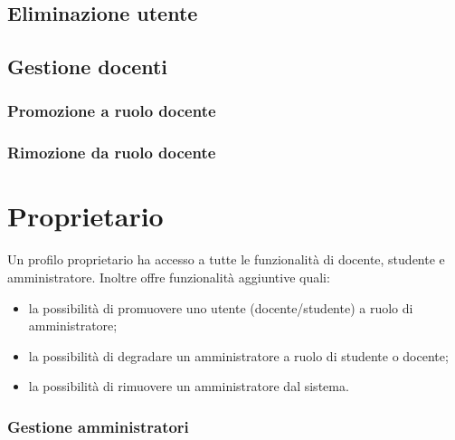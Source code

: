 \documentclass[12pt,a4paper]{article}
\begin{document}
	\subsection{Eliminazione utente}
	\TODO{}
	\subsection{Gestione docenti}
	\TODO{}
	\subsubsection{Promozione a ruolo docente}
	\TODO{}
	\subsubsection{Rimozione da ruolo docente}
	\TODO{}
	
	\section{Proprietario} 
	Un profilo proprietario ha accesso a tutte le funzionalità di docente, studente e amministratore.
	Inoltre offre funzionalità aggiuntive quali:
	\begin{itemize}
		\item la possibilità di promuovere uno utente (docente/studente) a ruolo di amministratore;
		\item la possibilità di degradare un amministratore a ruolo di studente o docente;
		\item la possibilità di rimuovere un amministratore dal sistema.
	\end{itemize}
	
	\subsubsection{Gestione  amministratori}
	\TODO{}

	
\end{document}
